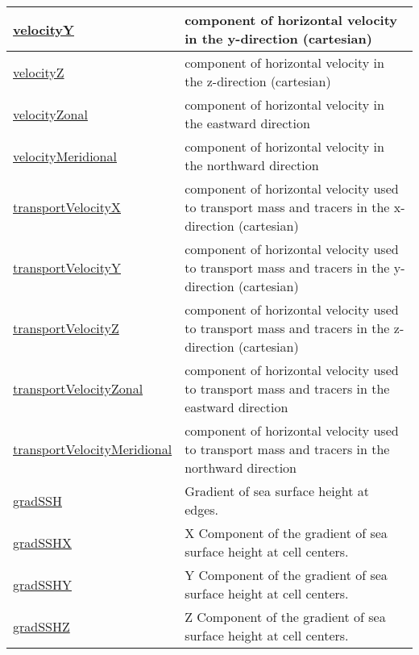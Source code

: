 {\begin{center}
\begin{longtable}{| p{2.0in} | p{4.0in} |}
    \hline
    \hyperref[subsec:var_sec_diagnostics_velocityY]{velocityY} & component of horizontal velocity in the y-direction (cartesian) \\
    \hline
    \hyperref[subsec:var_sec_diagnostics_velocityZ]{velocityZ} & component of horizontal velocity in the z-direction (cartesian) \\
    \hline
    \hyperref[subsec:var_sec_diagnostics_velocityZonal]{velocityZonal} & component of horizontal velocity in the eastward direction \\
    \hline
    \hyperref[subsec:var_sec_diagnostics_velocityMeridional]{velocityMeridional} & component of horizontal velocity in the northward direction \\
    \hline
    \hyperref[subsec:var_sec_diagnostics_transportVelocityX]{transportVelocityX} & component of horizontal velocity used to transport mass and tracers in the x-direction (cartesian) \\
    \hline
    \hyperref[subsec:var_sec_diagnostics_transportVelocityY]{transportVelocityY} & component of horizontal velocity used to transport mass and tracers in the y-direction (cartesian) \\
    \hline
    \hyperref[subsec:var_sec_diagnostics_transportVelocityZ]{transportVelocityZ} & component of horizontal velocity used to transport mass and tracers in the z-direction (cartesian) \\
    \hline
    \hyperref[subsec:var_sec_diagnostics_transportVelocityZonal]{transportVelocityZonal} & component of horizontal velocity used to transport mass and tracers in the eastward direction \\
    \hline
    \hyperref[subsec:var_sec_diagnostics_transportVelocityMeridional]{transportVelocityMeridional} & component of horizontal velocity used to transport mass and tracers in the northward direction \\
    \hline
    \hyperref[subsec:var_sec_diagnostics_gradSSH]{gradSSH} & Gradient of sea surface height at edges. \\
    \hline
    \hyperref[subsec:var_sec_diagnostics_gradSSHX]{gradSSHX} & X Component of the gradient of sea surface height at cell centers. \\
    \hline
    \hyperref[subsec:var_sec_diagnostics_gradSSHY]{gradSSHY} & Y Component of the gradient of sea surface height at cell centers. \\
    \hline
    \hyperref[subsec:var_sec_diagnostics_gradSSHZ]{gradSSHZ} & Z Component of the gradient of sea surface height at cell centers. \\

\end{longtable}
\end{center}}
